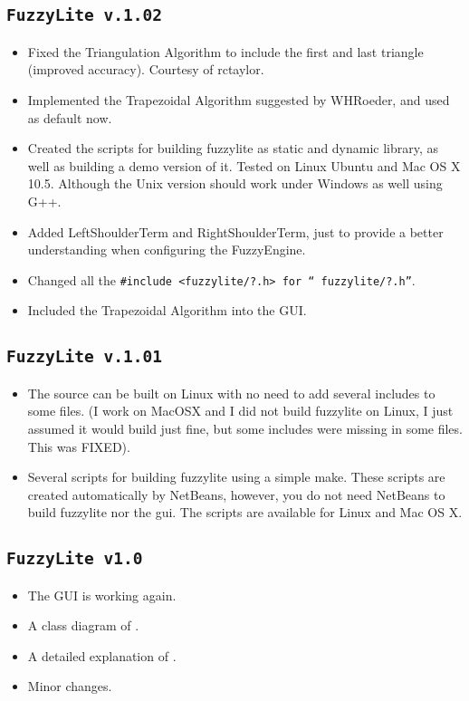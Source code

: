 	\subsection{\texttt{FuzzyLite v.1.02}}
	\begin{itemize} 
	  \item Fixed the Triangulation Algorithm to include the first and last
	  triangle (improved accuracy). Courtesy of rctaylor.
	  \item Implemented the Trapezoidal Algorithm suggested by WHRoeder, and used as default now.
	  \item Created the scripts for building fuzzylite as static and dynamic
	  library, as well as building a demo version of it. Tested on Linux Ubuntu and
	  Mac OS X 10.5. Although the Unix version should work under Windows as well
	  using G++.
	  \item Added LeftShoulderTerm and RightShoulderTerm, just to provide a better
	  understanding when configuring the FuzzyEngine.
	  \item Changed all the \texttt{\#include <fuzzylite/?.h> for ``
	  fuzzylite/?.h''}.
	  \item Included the Trapezoidal Algorithm into the GUI.
	\end{itemize}

	\subsection{\texttt{FuzzyLite v.1.01}}
	\begin{itemize}
		\item 	The source can be built on Linux with no need to add several includes to some files. (I work on MacOSX and I did not build fuzzylite on Linux, I just assumed it would build just fine, but some includes were missing in some files. This was FIXED).
	\item Several scripts for building fuzzylite using a simple make. These scripts are created automatically by NetBeans, however, you do not need NetBeans to build fuzzylite nor the gui. The scripts are available for Linux and Mac OS X.
	\end{itemize}
	
	\subsection{\texttt{FuzzyLite v1.0}}
	\begin{itemize}
		\item The GUI is working again.
		\item A class diagram of \fl.
		\item A detailed explanation of \fl.
		\item Minor changes.
	\end{itemize}

